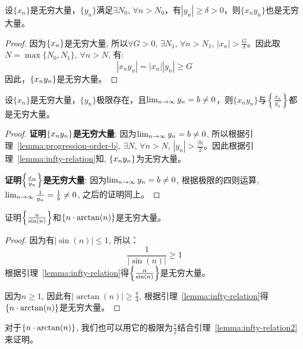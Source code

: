 \begin{lemma}\label{lemma:infty-relation}
    设$\{ x_n \}$是无穷大量，$\{ y_n \}$满足$\exists N_0$, $\forall n > N_0$，有$| y_n | \ge \delta > 0$，则$\{ x_n y_n\}$也是无穷大量。
\end{lemma}
\begin{proof}
    因为$\left\{ x_n\right\}$是无穷大量, 所以$\forall G > 0$, $\exists N_1$, $\forall n > N_1$, $|x_n| > \frac{G}{\delta}$。因此取$N = \max\{N_0, N_1\}$, $\forall n > N$, 有:
    \begin{equation*}
        |x_ny_n| = |x_n||y_n| \ge G
    \end{equation*}
    因此，$\left\{ x_ny_n\right\}$是无穷大量。
\end{proof}

\begin{lemma}\label{lemma:infty-relation2}
    设$\{ x_n \}$是无穷大量，$\{ y_n \}$极限存在，且$\lim_{n \to \infty } y_n = b \ne 0$，则$\{ x_n y_n\}$与$\left\{ \frac{x_n}{y_n} \right\}$都是无穷大量。
\end{lemma}
\begin{proof}
    {\bf 证明$\left\{ x_ny_n\right\}$是无穷大量}:
    因为$\lim_{n \to \infty } y_n = b \ne 0$, 所以根据引理~\ref{lemma:progression-order-b}, $\exists N$, $\forall n > N$, $|y_n| > \frac{|b|}{2}$。因此根据引理~\ref{lemma:infty-relation}知, $\left\{ x_ny_n\right\}$为无穷大量。

    {\bf 证明$\left\{ \frac{x_n}{y_n}\right\}$是无穷大量}:
    因为$\lim_{n \to \infty } y_n = b \ne 0$, 根据极限的四则运算, $\lim_{n \to \infty } \frac{1}{y_n} = \frac{1}{b} \ne 0$, 之后的证明同上。
\end{proof}

\begin{example}
    证明$\left\{ \frac{n}{\sin(n)}\right\}$和$\left\{ n \cdot \arctan(n)\right\}$是无穷大量。
\end{example}
\begin{proof}
    因为有$\left|\sin(n)\right| \le 1$, 所以：
    \begin{equation*}
        \frac{1}{\left|\sin(n)\right|} \ge 1
    \end{equation*}
    根据引理~\ref{lemma:infty-relation}得$\left\{ \frac{n}{\sin(n)}\right\}$是无穷大量。

    因为$n \ge 1$, 因此有$\left|\arctan(n)\right| \ge \frac{\pi}{4}$, 根据引理~\ref{lemma:infty-relation}得$\left\{ n \cdot \arctan(n)\right\}$是无穷大量。
\end{proof}
\begin{remark}
    对于$\left\{ n \cdot \arctan(n)\right\}$, 我们也可以用它的极限为$\frac{\pi}{2}$结合引理~\ref{lemma:infty-relation2}来证明。
\end{remark}

